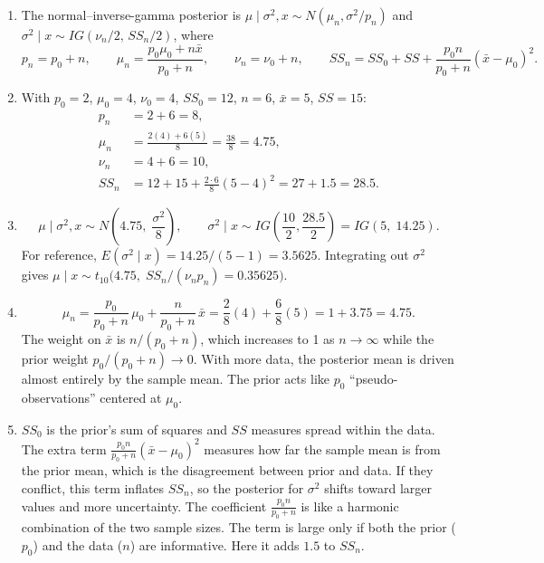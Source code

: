 \documentclass[11pt]{article}
\begin{document}
\begin{enumerate}
\item The normal--inverse-gamma posterior is
$\mu \mid \sigma^2, x \sim N(\mu_n, \sigma^2/p_n)$ and $\sigma^2 \mid x \sim IG(\nu_n/2,\, SS_n/2)$, where
\[
p_n = p_0 + n, \qquad
\mu_n = \frac{p_0\mu_0 + n\bar x}{p_0 + n}, \qquad
\nu_n = \nu_0 + n, \qquad
SS_n = SS_0 + SS + \frac{p_0 n}{p_0 + n}(\bar x - \mu_0)^2 .
\]

\item With $p_0 = 2$, $\mu_0 = 4$, $\nu_0 = 4$, $SS_0 = 12$, $n = 6$, $\bar x = 5$, $SS = 15$:
\begin{align*}
p_n &= 2 + 6 = 8,\\
\mu_n &= \frac{2(4) + 6(5)}{8} = \frac{38}{8} = 4.75,\\
\nu_n &= 4 + 6 = 10,\\
SS_n &= 12 + 15 + \frac{2\cdot 6}{8}(5-4)^2 = 27 + 1.5 = 28.5 .
\end{align*}

\item
\[
\mu \mid \sigma^2, x \sim N\!\left(4.75,\; \frac{\sigma^2}{8}\right), \qquad
\sigma^2 \mid x \sim IG\!\left(\frac{10}{2}, \frac{28.5}{2}\right) = IG(5,\; 14.25).
\]
For reference, $E(\sigma^2\mid x) = 14.25/(5-1) = 3.5625$. Integrating out $\sigma^2$ gives $\mu \mid x \sim t_{10}\big(4.75,\; SS_n/(\nu_n p_n) = 0.35625\big)$.

\item
\[
\mu_n = \frac{p_0}{p_0+n}\,\mu_0 + \frac{n}{p_0+n}\,\bar x = \frac{2}{8}(4) + \frac{6}{8}(5) = 1 + 3.75 = 4.75.
\]
The weight on $\bar x$ is $n/(p_0+n)$, which increases to 1 as $n\to\infty$ while the prior weight $p_0/(p_0+n) \to 0$. With more data, the posterior mean is driven almost entirely by the sample mean. The prior acts like $p_0$ ``pseudo-observations'' centered at $\mu_0$.

\item $SS_0$ is the prior's sum of squares and $SS$ measures spread within the data. The extra term $\frac{p_0 n}{p_0+n}(\bar x-\mu_0)^2$ measures how far the sample mean is from the prior mean, which is the disagreement between prior and data. If they conflict, this term inflates $SS_n$, so the posterior for $\sigma^2$ shifts toward larger values and more uncertainty. The coefficient $\frac{p_0 n}{p_0+n}$ is like a harmonic combination of the two sample sizes. The term is large only if both the prior ($p_0$) and the data ($n$) are informative. Here it adds $1.5$ to $SS_n$.
\end{enumerate}
\end{document}
